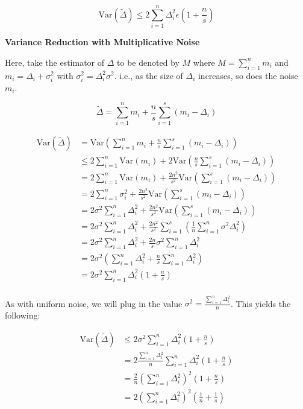\documentclass[11pt]{article}
\newcommand{\subsubsubsection}[1]{
  \vspace{1em} %
  \noindent\textbf{#1} %
  \vspace{0.5em} %
}
\begin{document}
\[
\mathrm{Var}(\tilde{\Delta}) \leq 2\sum_{i = 1}^{n}\Delta_i^2 \epsilon (1 + \frac{n}{s})
\]

\subsubsubsection{Variance Reduction with Multiplicative Noise}

Here, take the estimator of $\Delta$ to be denoted by $M$ where $M = \sum_{i = 1}^{n} m_i$ and $m_i = \Delta_i + \sigma_i^2$ with $\sigma_i^2 = \Delta_i^2 \sigma^2$.
i.e., as the size of $\Delta_i$ increases, so does the noise $m_i$.

\[
\tilde{\Delta} = \sum_{i = 1}^{n} m_i + \frac{n}{s} \sum_{i = 1}^{s} (m_i - \Delta_i)
\]

\[
\begin{aligned}
\mathrm{Var}(\tilde{\Delta}) &= \mathrm{Var}( \sum_{i = 1}^{n} m_i + \frac{n}{s} \sum_{i = 1}^{s} (m_i - \Delta_i)) \\
&\leq 2\sum_{i = 1}^{n} \mathrm{Var}(m_i) + 2\mathrm{Var}(\frac{n}{s} \sum_{i = 1}^{s} (m_i - \Delta_i)) \\
&= 2\sum_{i = 1}^{n} \mathrm{Var}(m_i) + \frac{2n^2}{s^2} \mathrm{Var}(\sum_{i = 1}^{s} (m_i - \Delta_i)) \\
&= 2\sum_{i = 1}^{n} \sigma_i^2 + \frac{2n^2}{s^2} \mathrm{Var}(\sum_{i = 1}^{s} (m_i - \Delta_i)) \\
&= 2\sigma^2\sum_{i = 1}^{n} \Delta_i^2 + \frac{2n^2}{s^2} \mathrm{Var}(\sum_{i = 1}^{s} (m_i - \Delta_i)) \\
&= 2\sigma^2\sum_{i = 1}^{n} \Delta_i^2 + \frac{2n^2}{s^2}\sum_{i = 1}^{s} (\frac{1}{n}\sum_{i = 1}^{n}\sigma^2\Delta_i^2) \\
&= 2\sigma^2\sum_{i = 1}^{n} \Delta_i^2 + \frac{2n}{s}\sigma^2\sum_{i = 1}^{n}\Delta_i^2 \\
&= 2\sigma^2(\sum_{i = 1}^{n} \Delta_i^2 + \frac{n}{s}\sum_{i = 1}^{n}\Delta_i^2) \\
&= 2\sigma^2\sum_{i = 1}^{n} \Delta_i^2(1 + \frac{n}{s}) \\
\end{aligned}
\]

As with uniform noise, we will plug in the value $\sigma^2 = \frac{\sum_{i = 1}^{n}\Delta_i^2}{n}$.
This yields the following:

\[
\begin{aligned}
\mathrm{Var}(\tilde{\Delta}) &\leq 2\sigma^2\sum_{i = 1}^{n} \Delta_i^2(1 + \frac{n}{s}) \\
&= 2\frac{\sum_{i = 1}^{n}\Delta_i^2}{n}\sum_{i = 1}^{n} \Delta_i^2(1 + \frac{n}{s}) \\
&= \frac{2}{n}(\sum_{i = 1}^{n}\Delta_i^2)^2(1 + \frac{n}{s}) \\
&= 2(\sum_{i = 1}^{n}\Delta_i^2)^2(\frac{1}{n} + \frac{1}{s}) \\
\end{aligned}
\]
\end{document}
